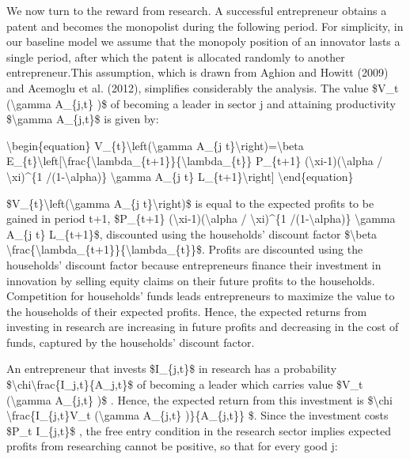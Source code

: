 \documentclass[10pt,math=newtx,citestyle=gb7714-2015,bibstyle=gb7714-2015]{elegantbook}
\begin{document}
	We now turn to the reward from research. A successful entrepreneur obtains a patent and becomes the monopolist during the following period. For simplicity, in our baseline model we assume that the monopoly position of an innovator lasts a single period, after which the patent is allocated randomly to another entrepreneur.This assumption, which is drawn from Aghion and Howitt (2009) and Acemoglu et al. (2012), simplifies considerably the analysis. The value \$V\_t (\textbackslash{}gamma A\_\{j,t\} )\$ of becoming a leader in sector j and attaining productivity \$\textbackslash{}gamma A\_\{j,t\}\$ is given by:
	
	\textbackslash{}begin\{equation\}
	V\_\{t\}\textbackslash{}left(\textbackslash{}gamma A\_\{j t\}\textbackslash{}right)=\textbackslash{}beta E\_\{t\}\textbackslash{}left[\textbackslash{}frac\{\textbackslash{}lambda\_\{t+1\}\}\{\textbackslash{}lambda\_\{t\}\} P\_\{t+1\} (\textbackslash{}xi-1)(\textbackslash{}alpha / \textbackslash{}xi)\^{}\{1 /(1-\textbackslash{}alpha)\} \textbackslash{}gamma A\_\{j t\} L\_\{t+1\}\textbackslash{}right]
	\textbackslash{}end\{equation\}
	
	\$V\_\{t\}\textbackslash{}left(\textbackslash{}gamma A\_\{j t\}\textbackslash{}right)\$ is equal to the expected profits to be gained in period t+1, \$P\_\{t+1\} (\textbackslash{}xi-1)(\textbackslash{}alpha / \textbackslash{}xi)\^{}\{1 /(1-\textbackslash{}alpha)\} \textbackslash{}gamma A\_\{j t\} L\_\{t+1\}\$, discounted using the households’ discount factor \$\textbackslash{}beta \textbackslash{}frac\{\textbackslash{}lambda\_\{t+1\}\}\{\textbackslash{}lambda\_\{t\}\}\$. Profits are discounted using the households’ discount factor because entrepreneurs finance their investment in innovation by selling equity claims on their future profits to the households. Competition for households’ funds leads entrepreneurs to maximize the value to the households of their expected profits. Hence, the expected returns from investing in research are increasing in future profits and decreasing in the cost of funds, captured by the households’ discount factor.
	
	An entrepreneur that invests \$I\_\{j,t\}\$ in research has a probability \$\textbackslash{}chi\textbackslash{}frac\{I\_j,t\}\{A\_j,t\}\$ of becoming a leader which carries value \$V\_t (\textbackslash{}gamma A\_\{j,t\} )\$ . Hence, the expected return from this investment is \$\textbackslash{}chi \textbackslash{}frac\{I\_\{j,t\}V\_t (\textbackslash{}gamma A\_\{j,t\} )\}\{A\_\{j,t\}\} \$. Since the investment costs \$P\_t I\_\{j,t\}\$ , the free entry condition in the research sector implies expected profits from researching cannot be positive, so that for every good j:
	
\end{document}
